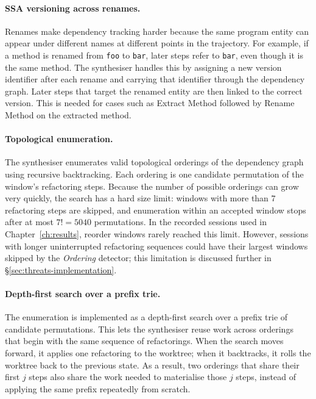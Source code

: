 \paragraph{SSA versioning across renames.}
Renames make dependency tracking harder because the same program entity can appear under different names at different points in the trajectory. For example, if a method is renamed from \texttt{foo} to \texttt{bar}, later steps refer to \texttt{bar}, even though it is the same method. The synthesiser handles this by assigning a new version identifier after each rename and carrying that identifier through the dependency graph. Later steps that target the renamed entity are then linked to the correct version. This is needed for cases such as Extract Method followed by Rename Method on the extracted method.

\paragraph{Topological enumeration.}
The synthesiser enumerates valid topological orderings of the dependency graph using recursive backtracking. Each ordering is one candidate permutation of the window's refactoring steps. Because the number of possible orderings can grow very quickly, the search has a hard size limit: windows with more than $7$ refactoring steps are skipped, and enumeration within an accepted window stops after at most $7! = 5040$ permutations. In the recorded sessions used in Chapter~\ref{ch:results}, reorder windows rarely reached this limit. However, sessions with longer uninterrupted refactoring sequences could have their largest windows skipped by the \emph{Ordering} detector; this limitation is discussed further in \S\ref{sec:threats-implementation}.

\paragraph{Depth-first search over a prefix trie.}
\label{sec:arch-reorder-engine}
The enumeration is implemented as a depth-first search over a prefix trie of candidate permutations. This lets the synthesiser reuse work across orderings that begin with the same sequence of refactorings. When the search moves forward, it applies one refactoring to the worktree; when it backtracks, it rolls the worktree back to the previous state. As a result, two orderings that share their first $j$ steps also share the work needed to materialise those $j$ steps, instead of applying the same prefix repeatedly from scratch.

